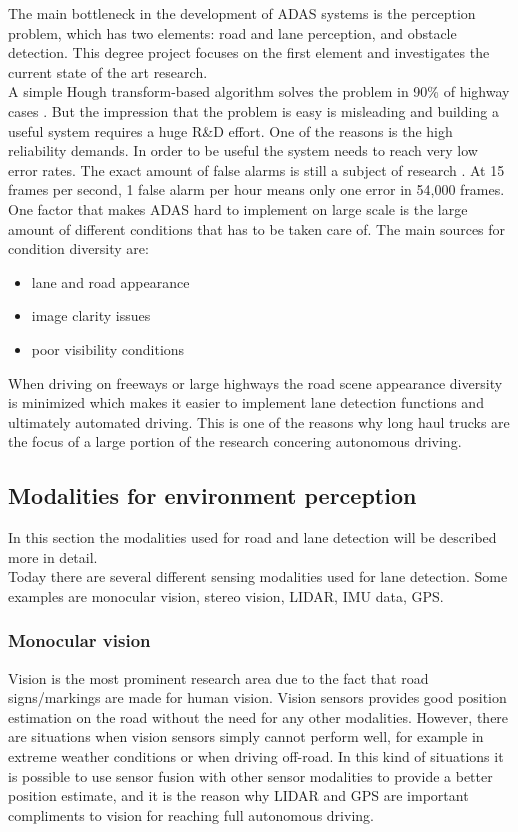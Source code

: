 The main bottleneck in the development of ADAS systems is the perception problem, which has two elements: road and lane perception, and obstacle detection. This degree project focuses on the first element and investigates the current state of the art research.\\

A simple Hough transform-based algorithm solves the problem in 90\% of highway cases \cite{BarHillel2014}. 
But the impression that the problem is easy is misleading and building a useful system requires a huge R\&{D} effort. One of the reasons is the high reliability demands. In order to be useful the system needs to reach very low error rates. The exact amount of false alarms is still a subject of research \cite{BarHillel2014}.
At 15 frames per second, 1 false alarm per hour means only one error in 54,000 frames.\\

One factor that makes ADAS hard to implement on large scale is the large amount of different conditions that has to be taken care of. The main sources for condition diversity are:
\begin{itemize}  
\item lane and road appearance
\item image clarity issues
\item poor visibility conditions
\end{itemize}

When driving on freeways or large highways the road scene appearance diversity is minimized which makes it easier to implement lane detection functions and ultimately automated driving. This is one of the reasons why long haul trucks are the focus of a large portion of the research concering autonomous driving. 

\subsection{Modalities for environment perception}
In this section the modalities used for road and lane detection will be described more in detail.\\

Today there are several different sensing modalities used for lane detection. Some examples are monocular vision, stereo vision, LIDAR, IMU data, GPS.\\

\subsubsection{Monocular vision}
Vision is the most prominent research area due to the fact that road signs/markings are made for human vision. Vision sensors provides good position estimation on the road without the need for any other modalities. However, there are situations when vision sensors simply cannot perform well, for example in extreme weather conditions or when driving off-road. In this kind of situations it is possible to use sensor fusion with other sensor modalities to provide a better position estimate, and it is the reason why LIDAR and GPS are important compliments to vision for reaching full autonomous driving.\\

